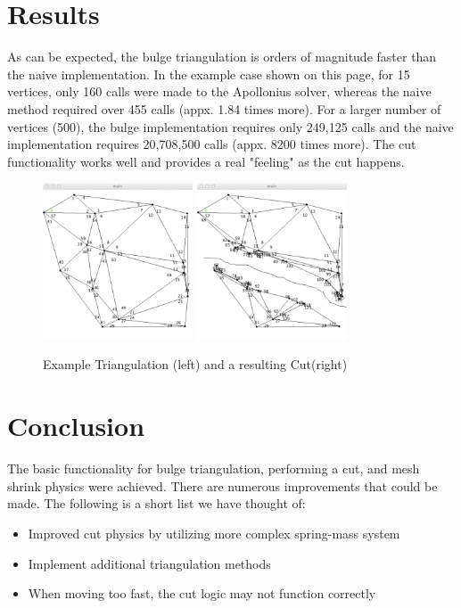 \documentclass[letterpaper,10pt]{IEEEtran}
\begin{document}
\section{Results}
As can be expected, the bulge triangulation is orders of magnitude faster than the naive implementation.  In the example case shown on this page, for 15 vertices, only 160 calls were made to the Apollonius solver, whereas the naive method required over 455 calls (appx. 1.84 times more).  For a larger number of vertices (500), the bulge implementation requires only 249,125 calls and the naive implementation requires 20,708,500 calls (appx. 8200 times more).  
The cut functionality works well and provides a real "feeling" as the cut happens. 
\begin{figure}[!t]
\centering
\includegraphics[width=1.75in]{main/data/triangulation}
\includegraphics[width=1.75in]{main/data/cut}
\caption{Example Triangulation (left) and a resulting Cut(right)}
\label{fig_triangulation}
\end{figure}

 \section{Conclusion}
 The basic functionality for bulge triangulation, performing a cut, and mesh shrink physics were achieved. 
There are numerous improvements that could be made.  The following is a short list we have thought of:
 \begin{multicols}{2}
\begin{itemize}
\setlength\multicolsep{0pt}
\itemsep0em
\item Improved cut physics by utilizing more complex spring-mass system
\item Implement additional triangulation methods
\item When moving too fast, the cut logic may not function correctly
\end{itemize}
\end{multicols}





%
\end{document}
